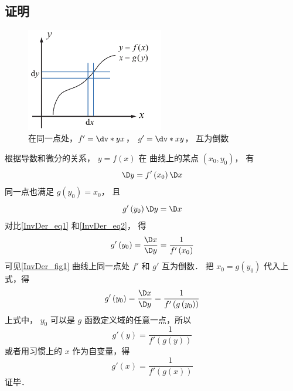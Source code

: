 \subsection{证明}
\begin{figure}[ht]
\centering
\includegraphics[width=6cm]{./figures/InvDer.pdf}
\caption{在同一点处，$f'=\dv*{y}{x}$， $g'=\dv*{x}{y}$， 互为倒数}\label{InvDer_fig1}
\end{figure}
根据导数和微分的关系， $y = f\left( x \right)$ 在 曲线上的某点 $\left( {{x_0},{y_0}} \right)$， 有
 \begin{equation}\label{InvDer_eq1}
\D y = f'\left( {{x_0}} \right)\D x
\end{equation}
同一点也满足 $g\left( {{y_0}} \right) = {x_0}$， 且
 \begin{equation}\label{InvDer_eq2}
g'\left( {{y_0}} \right)\D y = \D x
\end{equation}
对比\autoref{InvDer_eq1} 和\autoref{InvDer_eq2}， 得
\begin{equation}
g'\left( {{y_0}} \right) = \frac{\D x}{\D y} = \frac{1}{{f'\left( {{x_0}} \right)}}
\end{equation}
可见\autoref{InvDer_fig1} 曲线上同一点处 $f'$ 和 $g'$ 互为倒数． 把 ${x_0} = g\left( {{y_0}} \right)$ 代入上式，得
\begin{equation}
g'\left( {{y_0}} \right) = \frac{\D x}{\D y} = \frac{1}{{f'\left( {g\left( {{y_0}} \right)} \right)}}
\end{equation} 
上式中， ${y_0}$ 可以是 $g$ 函数定义域的任意一点，所以
\begin{equation}
g'\left( y \right) = \frac{1}{{f'\left( {g\left( y \right)} \right)}}
\end{equation} 
或者用习惯上的 $x$ 作为自变量，得
\begin{equation}
g'\left( x \right) = \frac{1}{{f'\left( {g\left( x \right)} \right)}}
\end{equation}
证毕．

















